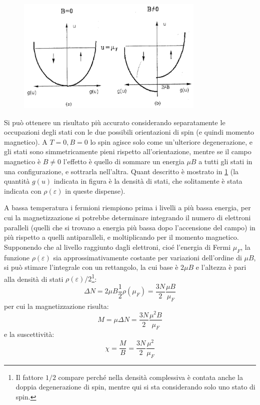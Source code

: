 \begin{figure}[t]
\centering
\includegraphics[width=0.8\textwidth]{Immagini/FermiMagnSusc.png}
\vspace{-10pt}
\caption{}
\label{fig:fermimagnsusc}
\vspace{-10pt}
\end{figure}

Si può ottenere un risultato più accurato considerando separatamente le occupazioni degli stati con le due possibili orientazioni di spin (e quindi momento magnetico).
A $ T=0, B=0 $ lo spin agisce solo come un'ulteriore degenerazione, e gli stati sono simmetricamente pieni rispetto all'orientazione, mentre se il campo magnetico è $ B\ne 0 $ l'effetto è quello di sommare un energia $ \mu B $ a tutti gli stati in una configurazione, e sottrarla nell'altra. Quant descritto è mostrato in \cref{fig:fermimagnsusc} (la quantità $ g(u) $ indicata in figura è la densità di stati, che solitamente è stata indicata con $ \rho(\varepsilon) $ in queste dispense).

A bassa temperatura i fermioni riempiono prima i livelli a più bassa energia, per cui la magnetizzazione si potrebbe determinare integrando il numero di elettroni paralleli (quelli che si trovano a energia più bassa dopo l'accensione del campo) in più rispetto a quelli antiparalleli, e moltiplicando per il momento magnetico.
Supponendo che al livello raggiunto dagli elettroni, cioé l'energia di Fermi $ \mu_F $, la funzione $ \rho(\varepsilon) $ sia approssimativamente costante per variazioni dell'ordine di $ \mu B $, si può stimare l'integrale con un rettangolo, la cui base è $ 2 \mu B $ e l'altezza è pari alla densità di stati $ \rho(\varepsilon)/2 $\footnote{Il fattore $ 1/2 $ compare perché nella densità complessiva è contata anche la doppia degenerazione di spin, mentre qui si sta considerando solo uno stato di spin.}:
\[ \Delta N = 2 \mu B \frac{1}{2} \rho(\mu_F) = \frac{3N}{2} \frac{\mu B}{\mu_F}\]
per cui la magnetizzazione risulta:
\[ M = \mu \Delta N = \frac{3N}{2} \frac{\mu^2 B}{\mu_F} \]
e la suscettività:
\[ \chi = \frac{M}{B} = \frac{3N}{2} \frac{\mu^2}{\mu_F} \]

